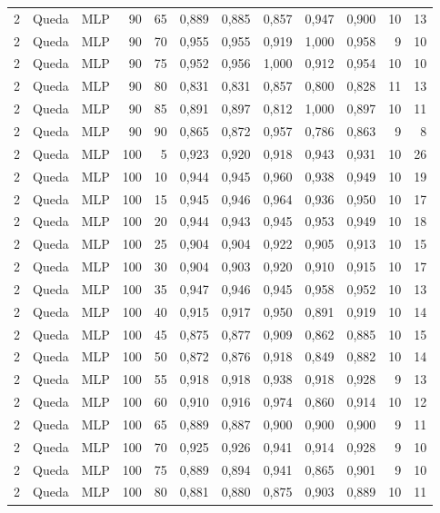 \begin{longtable}{@{}rllrrrrrrrrr@{}}
2 & Queda & MLP & 90 & 65 & 0,889 & 0,885 & 0,857 & 0,947 & 0,900 & 10 & 13 \\
2 & Queda & MLP & 90 & 70 & 0,955 & 0,955 & 0,919 & 1,000 & 0,958 & 9 & 10 \\
2 & Queda & MLP & 90 & 75 & 0,952 & 0,956 & 1,000 & 0,912 & 0,954 & 10 & 10 \\
2 & Queda & MLP & 90 & 80 & 0,831 & 0,831 & 0,857 & 0,800 & 0,828 & 11 & 13 \\
2 & Queda & MLP & 90 & 85 & 0,891 & 0,897 & 0,812 & 1,000 & 0,897 & 10 & 11 \\
2 & Queda & MLP & 90 & 90 & 0,865 & 0,872 & 0,957 & 0,786 & 0,863 & 9 & 8 \\
2 & Queda & MLP & 100 & 5 & 0,923 & 0,920 & 0,918 & 0,943 & 0,931 & 10 & 26 \\
2 & Queda & MLP & 100 & 10 & 0,944 & 0,945 & 0,960 & 0,938 & 0,949 & 10 & 19 \\
2 & Queda & MLP & 100 & 15 & 0,945 & 0,946 & 0,964 & 0,936 & 0,950 & 10 & 17 \\
2 & Queda & MLP & 100 & 20 & 0,944 & 0,943 & 0,945 & 0,953 & 0,949 & 10 & 18 \\
2 & Queda & MLP & 100 & 25 & 0,904 & 0,904 & 0,922 & 0,905 & 0,913 & 10 & 15 \\
2 & Queda & MLP & 100 & 30 & 0,904 & 0,903 & 0,920 & 0,910 & 0,915 & 10 & 17 \\
2 & Queda & MLP & 100 & 35 & 0,947 & 0,946 & 0,945 & 0,958 & 0,952 & 10 & 13 \\
2 & Queda & MLP & 100 & 40 & 0,915 & 0,917 & 0,950 & 0,891 & 0,919 & 10 & 14 \\
2 & Queda & MLP & 100 & 45 & 0,875 & 0,877 & 0,909 & 0,862 & 0,885 & 10 & 15 \\
2 & Queda & MLP & 100 & 50 & 0,872 & 0,876 & 0,918 & 0,849 & 0,882 & 10 & 14 \\
2 & Queda & MLP & 100 & 55 & 0,918 & 0,918 & 0,938 & 0,918 & 0,928 & 9 & 13 \\
2 & Queda & MLP & 100 & 60 & 0,910 & 0,916 & 0,974 & 0,860 & 0,914 & 10 & 12 \\
2 & Queda & MLP & 100 & 65 & 0,889 & 0,887 & 0,900 & 0,900 & 0,900 & 9 & 11 \\
2 & Queda & MLP & 100 & 70 & 0,925 & 0,926 & 0,941 & 0,914 & 0,928 & 9 & 10 \\
2 & Queda & MLP & 100 & 75 & 0,889 & 0,894 & 0,941 & 0,865 & 0,901 & 9 & 10 \\
2 & Queda & MLP & 100 & 80 & 0,881 & 0,880 & 0,875 & 0,903 & 0,889 & 10 & 11 \\

\end{longtable}
